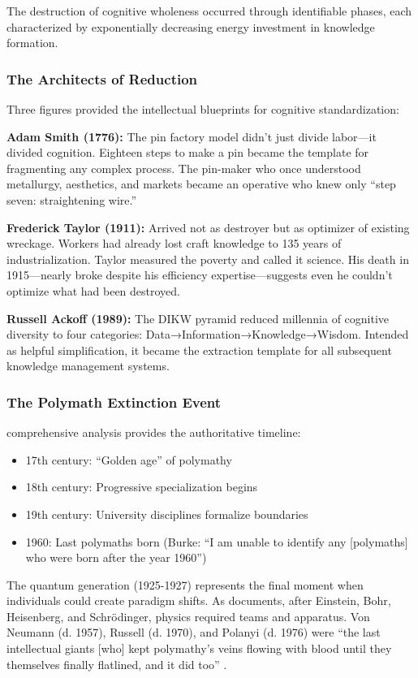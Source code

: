 The destruction of cognitive wholeness occurred through identifiable phases, each characterized by exponentially decreasing energy investment in knowledge formation.

\subsubsection{The Architects of Reduction}

Three figures provided the intellectual blueprints for cognitive standardization:

\textbf{Adam Smith (1776):} The pin factory model didn't just divide labor---it divided cognition. Eighteen steps to make a pin became the template for fragmenting any complex process. The pin-maker who once understood metallurgy, aesthetics, and markets became an operative who knew only ``step seven: straightening wire.''

\textbf{Frederick Taylor (1911):} Arrived not as destroyer but as optimizer of existing wreckage. Workers had already lost craft knowledge to 135 years of industrialization. Taylor measured the poverty and called it science. His death in 1915---nearly broke despite his efficiency expertise---suggests even he couldn't optimize what had been destroyed.

\textbf{Russell Ackoff (1989):} The DIKW pyramid reduced millennia of cognitive diversity to four categories: Data→Information→Knowledge→Wisdom. Intended as helpful simplification, it became the extraction template for all subsequent knowledge management systems.

\subsubsection{The Polymath Extinction Event}

\citet{burke2020} comprehensive analysis provides the authoritative timeline:
\begin{itemize}
\item 17th century: ``Golden age'' of polymathy
\item 18th century: Progressive specialization begins
\item 19th century: University disciplines formalize boundaries
\item 1960: Last polymaths born (Burke: ``I am unable to identify any [polymaths] who were born after the year 1960'')
\end{itemize}

The quantum generation (1925-1927) represents the final moment when individuals could create paradigm shifts. As \citet{beller1996} documents, after Einstein, Bohr, Heisenberg, and Schrödinger, physics required teams and apparatus. Von Neumann (d. 1957), Russell (d. 1970), and Polanyi (d. 1976) were ``the last intellectual giants [who] kept polymathy's veins flowing with blood until they themselves finally flatlined, and it did too'' \citep{hoel2025}.

